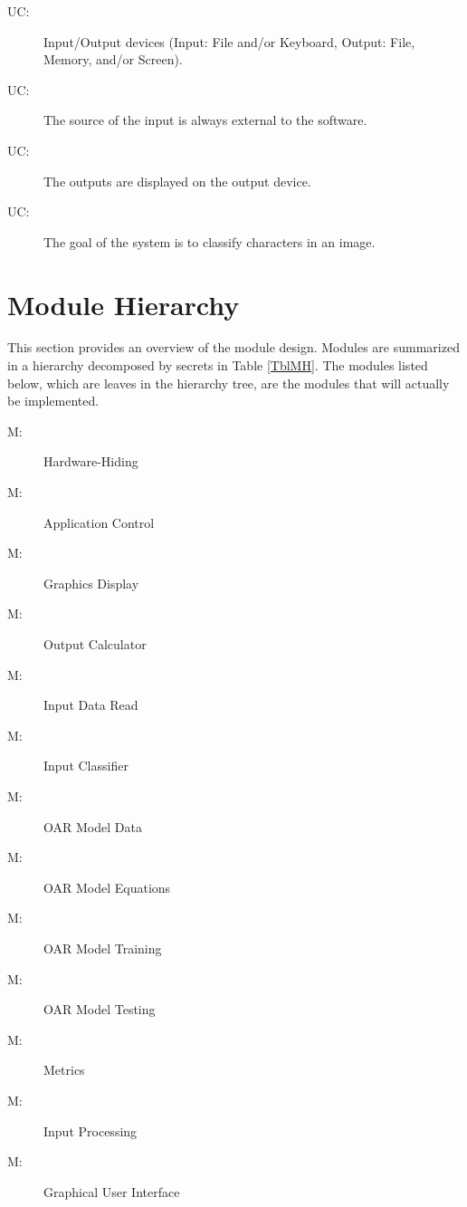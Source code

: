 \documentclass[12pt, titlepage]{article}
\newcounter{ucnum}
\newcommand{\uctheucnum}{UC\theucnum}
\newcounter{mnum}
\newcommand{\mthemnum}{M\themnum}
\begin{document}
\begin{description}
\item[ \uctheucnum \label{ucIO}:] Input/Output devices
  (Input: File and/or Keyboard, Output: File, Memory, and/or Screen).
\item[ \uctheucnum \label{ucInput}:] The source of the input is always external to the software.
\item[ \uctheucnum \label{ucOutput}:] The outputs are displayed on the output device.
\item[ \uctheucnum \label{ucGoal}:] The goal of the system is to classify characters in an image.

\end{description}

\section{Module Hierarchy} \label{SecMH}

This section provides an overview of the module design. Modules are summarized
in a hierarchy decomposed by secrets in Table \ref{TblMH}. The modules listed
below, which are leaves in the hierarchy tree, are the modules that will
actually be implemented.

\begin{description}
\item [ \mthemnum \label{mHH}:] Hardware-Hiding
\item [ \mthemnum \label{mAC}:] Application Control 
\item [ \mthemnum \label{mGD}:] Graphics Display
\item [ \mthemnum \label{mOU}:] Output Calculator 
\item [ \mthemnum \label{mIDR}:] Input Data Read 
\item [ \mthemnum \label{mIC}:] Input Classifier
\item [ \mthemnum \label{mOMD}:] OAR Model Data 
\item [ \mthemnum \label{mOME}:] OAR Model Equations
\item [ \mthemnum \label{mOMTr}:] OAR Model Training 
\item [ \mthemnum \label{mOMTs}:] OAR Model Testing 
\item [ \mthemnum \label{mCMX}:] Metrics
\item [ \mthemnum \label{mIP}:] Input Processing 
\item [ \mthemnum \label{mGUI}:] Graphical User Interface
\end{description}
\end{document}

